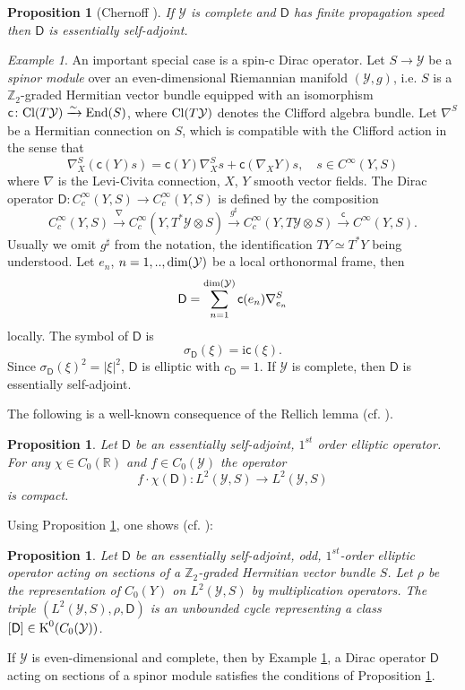 \documentclass[11pt,reqno]{amsart}
\newtheorem{proposition}[theorem]{Proposition}
\theoremstyle{definition}
\theoremstyle{remark}
\newtheorem{example}[theorem]{Example}
\newcommand{\st}[1]{\mathsf{#1}}
\renewcommand{\i}{{\mathrm{i}}}
\def\Y{\ensuremath{\mathcal{Y}}}
\def\K{\ensuremath{\mathcal{K}}}
\def\c{\ensuremath{\mathsf{c}}}
\def\bR{\ensuremath{\mathbb{R}}}
\def\bZ{\ensuremath{\mathbb{Z}}}
\def\End{\ensuremath{\textnormal{End}}}
\def\Cl{\ensuremath{\textnormal{Cl}}}
\def\dim{\ensuremath{\textnormal{dim}}}
\def\K{\ensuremath{\textnormal{K}}}
\begin{document}
\begin{proposition}[Chernoff \cite{ChernoffSelfAdjoint}]
If $\Y$ is complete and $\st{D}$ has finite propagation speed then $\st{D}$ is essentially self-adjoint.
\end{proposition}
\begin{example}\label{ex:DiracOp}
An important special case is a spin-c Dirac operator.  Let $S \rightarrow \Y$ be a \emph{spinor module} over an even-dimensional Riemannian manifold $(\Y,g)$, i.e. $S$ is a $\bZ_2$-graded Hermitian vector bundle equipped with an isomorphism $\c \colon \Cl(T\Y) \xrightarrow{\sim} \End(S)$, where $\Cl(T\Y)$ denotes the Clifford algebra bundle.  Let $\nabla^S$ be a Hermitian connection on $S$, which is compatible with the Clifford action in the sense that
\[ \nabla^S_X(\c(Y)s)=\c(Y)\nabla_X^S s+\c(\nabla_XY)s, \quad s \in C^\infty(Y,S)\]
where $\nabla$ is the Levi-Civita connection, $X$, $Y$ smooth vector fields.  The Dirac operator $\st{D}\colon C^\infty_c(Y,S) \rightarrow C^\infty_c(Y,S)$ is defined by the composition
\[ C^\infty_c(Y,S) \xrightarrow{\nabla} C_c^\infty(Y,T^\ast \Y \otimes S) \xrightarrow{g^\sharp} C_c^\infty(Y,T\Y \otimes S) \xrightarrow{\c} C^\infty(Y,S).\]
Usually we omit $g^\sharp$ from the notation, the identification $TY \simeq T^\ast Y$ being understood.  Let $e_n$, $n=1,..,\dim(\Y)$ be a local orthonormal frame, then
\[\st{D}=\sum_{n=1}^{\dim(\Y)} \c(e_n)\nabla_{e_n}^S\]
locally.  The symbol of $\st{D}$ is
\[ \sigma_{\st{D}}(\xi)=\i\c(\xi).\]
Since $\sigma_{\st{D}}(\xi)^2=|\xi|^2$, $\st{D}$ is elliptic with $c_{\st{D}}=1$.  If $\Y$ is complete, then $\st{D}$ is essentially self-adjoint.
\end{example}

The following is a well-known consequence of the Rellich lemma (cf. \cite[Proposition 10.5.2]{HigsonRoe}).
\begin{proposition}
\label{RellichLemma}
Let $\st{D}$ be an essentially self-adjoint, $1^{st}$ order elliptic operator.  For any $\chi \in C_0(\bR)$ and $f \in C_0(\Y)$ the operator
\[ f \cdot \chi(\st{D})\colon L^2(\Y,S) \rightarrow L^2(\Y,S) \]
is compact.
\end{proposition}
Using Proposition \ref{RellichLemma}, one shows (cf. \cite[Theorem 10.6.5]{HigsonRoe}):
\begin{proposition}
\label{prop:KHomologyClass}
Let $\st{D}$ be an essentially self-adjoint, odd, $1^{st}$-order elliptic operator acting on sections of a $\bZ_2$-graded Hermitian vector bundle $S$.  Let $\rho$ be the representation of $C_0(Y)$ on $L^2(\Y,S)$ by multiplication operators.  The triple $(L^2(\Y,S),\rho,\st{D})$ is an unbounded cycle representing a class $[\st{D}] \in \K^0(C_0(\Y))$.
\end{proposition}
If $\Y$ is even-dimensional and complete, then by Example \ref{ex:DiracOp}, a Dirac operator $\st{D}$ acting on sections of a spinor module satisfies the conditions of Proposition \ref{prop:KHomologyClass}.
\end{document}
